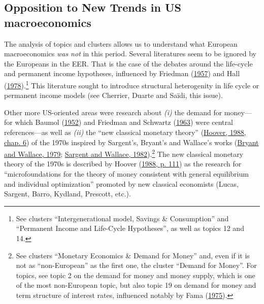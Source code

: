 \documentclass[
  12pt,
  onecolumn]{article}
\begin{document}
\hypertarget{opposition-trends}{%
\subsection{Opposition to New Trends in US
macroeconomics}\label{opposition-trends}}

The analysis of topics and clusters allows us to understand what
European macroeconomics \emph{was not} in this period. Several
literatures seem to be ignored by the Europeans in the EER. That is the
case of the debates around the life-cycle and permanent income
hypotheses, influenced by Friedman
(\protect\hyperlink{ref-friedman1957}{1957}) and Hall
(\protect\hyperlink{ref-hall1978b}{1978}).\footnote{See clusters
  ``Intergenerational model, Savings \& Consumption'' and ``Permanent
  Income and Life-Cycle Hypotheses'', as well as topics 12 and 14.} This
literature sought to introduce structural heterogenity in life cycle or
permanent income models (see Cherrier, Duarte and Saïdi, this issue).

Other more US-oriented areas were research about \emph{(i)} the demand
for money---for which Baumol (\protect\hyperlink{ref-baumol1952}{1952})
and Friedman and Schwartz (\protect\hyperlink{ref-friedman1963}{1963})
were central references---as well as \emph{(ii)} the ``new classical
monetary theory'' (\protect\hyperlink{ref-hoover1988}{Hoover, 1988,
chap. 6}) of the 1970s inspired by Sargent's, Bryant's and Wallace's
works (\protect\hyperlink{ref-bryant1979}{Bryant and Wallace, 1979};
\protect\hyperlink{ref-sargent1982}{Sargent and Wallace,
1982}).\footnote{See clusters ``Monetary Economics \& Demand for Money''
  and, even if it is not as ``non-European'' as the first one, the
  cluster ``Demand for Money''. For topics, see topic 2 on the demand
  for money and money supply, which is one of the most non-European
  topic, but also topic 19 on demand for money and term structure of
  interest rates, influenced notably by Fama
  (\protect\hyperlink{ref-fama1975}{1975}).} The new classical monetary
theory of the 1970s is described by Hoover
(\protect\hyperlink{ref-hoover1988}{1988, p. 111}) as the research for
``microfoundations for the theory of money consistent with general
equilibrium and individual optimization'' promoted by new classical
economists (Lucas, Sargent, Barro, Kydland, Prescott, etc.).
\end{document}
